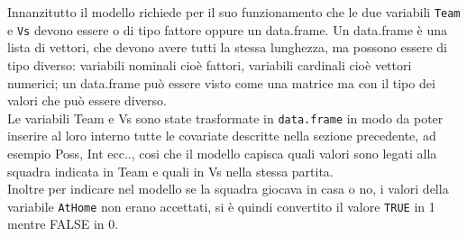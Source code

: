 Innanzitutto il modello richiede per il suo funzionamento che le due variabili \texttt{Team} e \texttt{Vs} devono essere o di tipo fattore oppure un \textsf{data.frame}. Un \textsf{data.frame} è una lista di vettori, che devono avere tutti la stessa lunghezza, ma possono essere di tipo diverso: variabili nominali cioè fattori, variabili cardinali cioè vettori numerici; un \textsf{data.frame} può essere visto come una matrice ma con il tipo dei valori che può essere diverso.\\ 
Le variabili \textsf{Team} e \textsf{Vs} sono state trasformate in \texttt{data.frame} in modo da poter inserire al loro interno tutte le covariate descritte nella sezione precedente, ad esempio \textsf{Poss}, \textsf{Int} ecc.., cosi che il modello capisca quali valori sono legati alla squadra indicata in \textsf{Team} e quali in \textsf{Vs} nella stessa partita.\\

Inoltre per indicare nel modello se la squadra giocava in casa o no, i valori della variabile \texttt{AtHome} non erano accettati, si è quindi convertito il valore \texttt{TRUE} in 1 mentre FALSE in 0.



